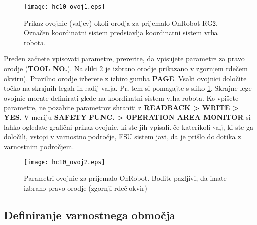 \begin{figure}[!hbt]
	\centering
	\texttt{[image: hc10\_ovoj1.eps]}
	\caption{Prikaz ovojnic (valjev) okoli orodja za prijemalo OnRobot RG2. Označen koordinatni sistem predstavlja koordinatni sistem vrha robota.}
	\label{fig:hc10_ovoj1}
\end{figure}

Preden začnete vpisovati parametre, preverite, da vpisujete parametre za pravo orodje (\textbf{TOOL NO.}). Na sliki \ref{fig:hc10_ovoj2} je izbrano orodje prikazano v zgornjem rdečem okviru). Pravilno orodje izberete z izbiro gumba \textbf{PAGE}. Vsaki ovojnici določite točko na skrajnih legah in radij valja. Pri tem si pomagajte s sliko \ref{fig:hc10_ovoj1}. Skrajne lege ovojnic morate definirati glede na koordinatni sistem vrha robota. Ko vpišete parametre, ne pozabite parametrov shraniti z \textbf{READBACK > WRITE > YES}. V meniju \textbf{SAFETY FUNC. > OPERATION AREA MONITOR} si lahko ogledate grafični prikaz ovojnic, ki ste jih vpisali. če katerikoli valj, ki ste ga določili, vstopi v varnostno področje, FSU sistem javi, da je prišlo do dotika z varnostnim področjem.

\begin{figure}[!hbt]
	\centering
	\texttt{[image: hc10\_ovoj2.eps]}
	\caption{Parametri ovojnic za prijemalo OnRobot. Bodite pazljivi, da imate izbrano pravo orodje (zgornji rdeč okvir)}
	\label{fig:hc10_ovoj2}
\end{figure}

\subsection*{Definiranje varnostnega območja}

